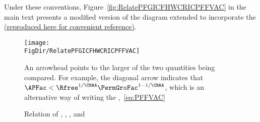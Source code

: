 \documentclass[\econtexRoot/BufferStockTheory]{subfiles}
\begin{document}
Under these conventions, Figure~\ref{fig:RelatePFGICFHWCRICPFFVAC} in the main text presents a modified version of the diagram extended to incorporate the {\PFFVAC} \href{https://econ-ark.github.io/BufferStockTheory/#RelatePFGICFHWCRICPFFVAC}{(reproduced here for convenient reference)}.

\begin{figure}[ht]
  \centerline{
    \texttt{[image: \\FigDir/RelatePFGICFHWCRICPFFVAC]}
  }
  \caption{Relation of \GICRaw, \FHWC, \RIC, and \PFFVAC}\label{fig:RelatePFGICFHWCRICPFFVACApp}
  \footnotesize{An arrowhead points to the larger of the two quantities being compared.  For example, the diagonal arrow indicates that $\APFac < \Rfree^{1/\CRRA}\PermGroFac^{1-1/\CRRA}$, which is an alternative way of writing the {\PFFVAC},~\eqref{eq:PFFVAC}}
\end{figure}
\end{document}
